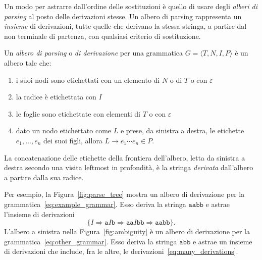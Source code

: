 Un modo per astrarre dall'ordine delle sostituzioni \`e quello di usare
degli \emph{alberi di parsing} al posto delle derivazioni stesse. Un albero
di parsing rappresenta un \emph{insieme} di derivazioni, tutte quelle
che derivano la stessa stringa, a partire dal non terminale
di partenza, con qualsiasi criterio di sostituzione.
%
\begin{definition}\label{def:parsing_tree}
Un \emph{albero di parsing} o \emph{di derivazione}
per una grammatica $G=\langle T,N,I,P\rangle$ \`e un albero tale che:
\begin{enumerate}
\item i suoi nodi sono etichettati con un elemento di $N$ o di $T$ o con $\varepsilon$
\item la radice \`e etichettata con $I$
\item le foglie sono etichettate con elementi di $T$ o con $\varepsilon$
\item dato un nodo etichettato come $L$ e prese, da sinistra a destra,
      le etichette $e_1,\ldots,e_n$ dei suoi figli, allora
      $L\to e_1\cdots e_n\in P$.
\end{enumerate}
La concatenazione delle etichette della
frontiera dell'albero, letta da sinistra a destra secondo una visita
leftmost in profondit\`a, \`e la stringa
\emph{derivata} dall'albero a partire dalla sua radice.
\end{definition}
%
\noindent
Per esempio, la Figura~\ref{fig:parse_tree} mostra un albero di derivazione
per la grammatica~\eqref{eq:example_grammar}. Esso deriva la stringa
$\mathtt{aabb}$ e astrae l'insieme di derivazioni
\[
  \{I\Rightarrow\mathtt{a}I\mathtt{b}\Rightarrow\mathtt{aa}I\mathtt{bb}
    \Rightarrow\mathtt{aabb}\}.
\]
%
L'albero a sinistra nella Figura~\ref{fig:ambiguity} \`e un albero di
derivazione per la grammatica~\eqref{eq:other_grammar}. Esso deriva la stringa
$\mathtt{abb}$ e astrae un insieme di derivazioni che include, fra
le altre, le derivazioni~\eqref{eq:many_derivations}.

